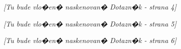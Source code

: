 \newpage
\null
\vfill
\begin{center}
\textit{[Tu bude vlo�en� naskenovan� Dotazn�k - strana 4]}
\end{center}
\vfill
\clearpage

\newpage
\null
\vfill
\begin{center}
\textit{[Tu bude vlo�en� naskenovan� Dotazn�k - strana 5]}
\end{center}
\vfill
\clearpage

\newpage
\null
\vfill
\begin{center}
\textit{[Tu bude vlo�en� naskenovan� Dotazn�k - strana 6]}
\end{center}
\vfill
\clearpage

